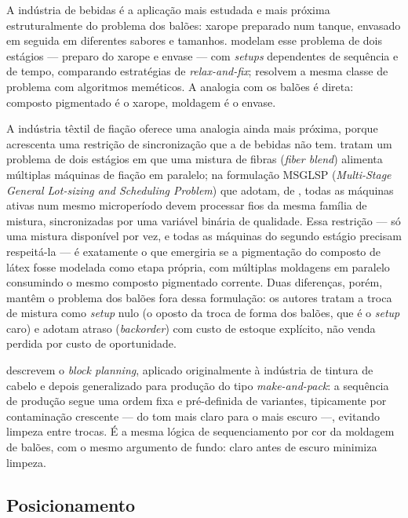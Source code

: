 \documentclass[fleqn,12pt,a4paper]{article}
\begin{document}
A indústria de bebidas é a aplicação mais estudada e mais próxima estruturalmente do problema dos balões: xarope preparado num tanque, envasado em seguida em diferentes sabores e tamanhos.  modelam esse problema de dois estágios --- preparo do xarope e envase --- com \textit{setups} dependentes de sequência e de tempo, comparando estratégias de \textit{relax-and-fix};  resolvem a mesma classe de problema com algoritmos meméticos. A analogia com os balões é direta: composto pigmentado é o xarope, moldagem é o envase.

A indústria têxtil de fiação oferece uma analogia ainda mais próxima, porque acrescenta uma restrição de sincronização que a de bebidas não tem.  tratam um problema de dois estágios em que uma mistura de fibras (\textit{fiber blend}) alimenta múltiplas máquinas de fiação em paralelo; na formulação MSGLSP (\textit{Multi-Stage General Lot-sizing and Scheduling Problem}) que adotam, de , todas as máquinas ativas num mesmo microperíodo devem processar fios da mesma família de mistura, sincronizadas por uma variável binária de qualidade. Essa restrição --- só uma mistura disponível por vez, e todas as máquinas do segundo estágio precisam respeitá-la --- é exatamente o que emergiria se a pigmentação do composto de látex fosse modelada como etapa própria, com múltiplas moldagens em paralelo consumindo o mesmo composto pigmentado corrente. Duas diferenças, porém, mantêm o problema dos balões fora dessa formulação: os autores tratam a troca de mistura como \textit{setup} nulo (o oposto da troca de forma dos balões, que é o \textit{setup} caro) e adotam atraso (\textit{backorder}) com custo de estoque explícito, não venda perdida por custo de oportunidade.

 descrevem o \textit{block planning}, aplicado originalmente à indústria de tintura de cabelo e depois generalizado para produção do tipo \textit{make-and-pack}: a sequência de produção segue uma ordem fixa e pré-definida de variantes, tipicamente por contaminação crescente --- do tom mais claro para o mais escuro ---, evitando limpeza entre trocas. É a mesma lógica de sequenciamento por cor da moldagem de balões, com o mesmo argumento de fundo: claro antes de escuro minimiza limpeza.

\subsection{Posicionamento}
\label{sec:posicionamento}
\end{document}
